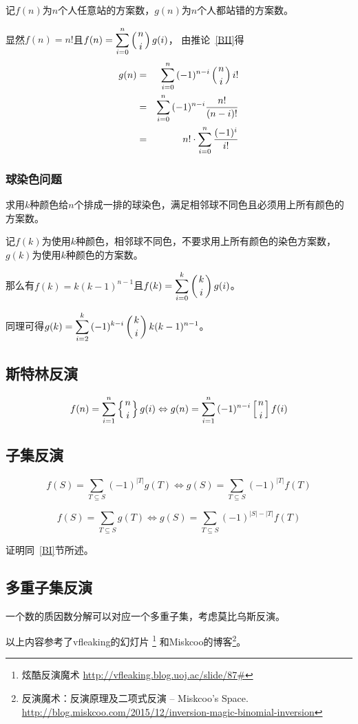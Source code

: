 记$f(n)$为$n$个人任意站的方案数，$g(n)$为$n$个人都站错的方案数。

显然$f(n)=n!$且$\displaystyle f(n)=\sum_{i=0}^n{\left(n \atop i\right) g(i)}$，
由推论~\ref{BII}得
\begin{eqnarray*}
	g(n)&=&\sum_{i=0}^n{(-1)^{n-i}\left(n \atop i\right)i!}\\
	&=&\sum_{i=0}^n{(-1)^{n-i}\frac{n!}{(n-i)!}}\\
	&=&n!\cdot\sum_{i=0}^n{\frac{(-1)^i}{i!}}
\end{eqnarray*}
\subsubsection{球染色问题}
求用$k$种颜色给$n$个排成一排的球染色，满足相邻球不同色且必须用上所有颜色的方案数。

记$f(k)$为使用$k$种颜色，相邻球不同色，不要求用上所有颜色的染色方案数，
$g(k)$为使用$k$种颜色的方案数。

那么有$f(k)=k(k-1)^{n-1}$且$\displaystyle f(k)=\sum_{i=0}^k{\left(k \atop i\right)g(i)}$。

同理可得$\displaystyle g(k)=\sum_{i=2}^k{(-1)^{k-i}\left(k \atop i\right)k(k-1)^{n-1}}$。

\subsection{斯特林反演}
\begin{theorem}
    \begin{displaymath}
        f(n)=\sum_{i=1}^n{\left\{n \atop i\right\}g(i)}
        \Leftrightarrow
        g(n)=\sum_{i=1}^n{(-1)^{n-i}\left[n \atop i\right]f(i)}
    \end{displaymath}
\end{theorem}
\subsection{子集反演}
\begin{theorem}
	\begin{displaymath}
		f(S)=\sum_{T\subseteq S}{(-1)^{|T|}g(T)}
		\Leftrightarrow
		g(S)=\sum_{T\subseteq S}{(-1)^{|T|}f(T)}
	\end{displaymath}
\end{theorem}
\begin{inference}
	\begin{displaymath}
		f(S)=\sum_{T\subseteq S}{g(T)}
		\Leftrightarrow
		g(S)=\sum_{T\subseteq S}{(-1)^{|S|-|T|}f(T)}
	\end{displaymath}
\end{inference}
证明同~\ref{BI}节所述。
\subsection{多重子集反演}
一个数的质因数分解可以对应一个多重子集，考虑莫比乌斯反演。

以上内容参考了vfleaking的幻灯片
\footnote{炫酷反演魔术 \url{http://vfleaking.blog.uoj.ac/slide/87\#}}
和Miskcoo的博客\footnote{反演魔术：反演原理及二项式反演 – Miskcoo's Space.
	\url{http://blog.miskcoo.com/2015/12/inversion-magic-binomial-inversion}
}。
